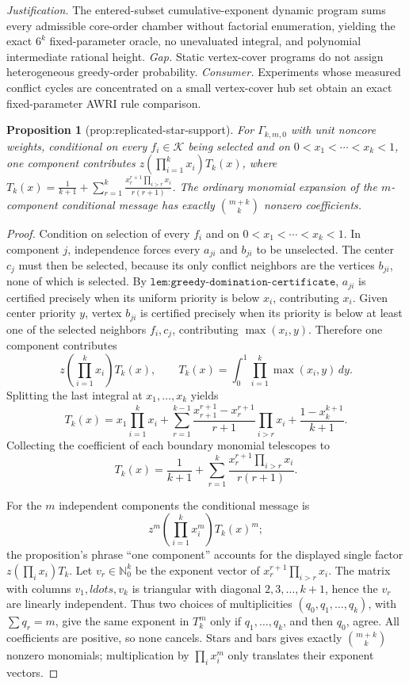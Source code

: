 \documentclass{article}
\newtheorem{proposition}{Proposition}
\begin{document}
\par\smallskip\noindent \textit{Justification.} The entered-subset cumulative-exponent dynamic program sums every admissible core-order chamber without factorial enumeration, yielding the exact \(6^k\) fixed-parameter oracle, no unevaluated integral, and polynomial intermediate rational height. \textit{Gap.} Static vertex-cover programs do not assign heterogeneous greedy-order probability. \textit{Consumer.} Experiments whose measured conflict cycles are concentrated on a small vertex-cover hub set obtain an exact fixed-parameter AWRI rule comparison.

\begin{proposition}[prop:replicated-star-support]\label{prop:replicated-star-support}
For \(\Gamma_{k,m,0}\) with unit noncore weights, conditional on every \(f_i\in\mathcal K\) being selected and on \(0<x_1<\cdots<x_k<1\), one component contributes \(z(\prod_{i=1}^kx_i)T_k(x)\), where \(T_k(x)=\frac1{k+1}+\sum_{r=1}^k\frac{x_r^{r+1}\prod_{i>r}x_i}{r(r+1)}\). The ordinary monomial expansion of the \(m\)-component conditional message has exactly \(\binom{m+k}{k}\) nonzero coefficients.
\end{proposition}
\begin{proof}
Condition on selection of every \(f_i\) and on \(0<x_1<\cdots<x_k<1\).  In component \(j\), independence forces every \(a_{ji}\) and \(b_{ji}\) to be unselected.  The center \(c_j\) must then be selected, because its only conflict neighbors are the vertices \(b_{ji}\), none of which is selected.  By \(\texttt{lem:greedy-domination-certificate}\), \(a_{ji}\) is certified precisely when its uniform priority is below \(x_i\), contributing \(x_i\).  Given center priority \(y\), vertex \(b_{ji}\) is certified precisely when its priority is below at least one of the selected neighbors \(f_i,c_j\), contributing \(\max(x_i,y)\).  Therefore one component contributes
\[
 z\left(\prod_{i=1}^kx_i\right)T_k(x),\qquad
 T_k(x)=\int_0^1\prod_{i=1}^k\max(x_i,y)\,dy.
\]
Splitting the last integral at \(x_1,\ldots,x_k\) yields
\[
 T_k(x)=x_1\prod_{i=1}^kx_i+
 \sum_{r=1}^{k-1}\frac{x_{r+1}^{r+1}-x_r^{r+1}}{r+1}
       \prod_{i>r}x_i+\frac{1-x_k^{k+1}}{k+1}.
\]
Collecting the coefficient of each boundary monomial telescopes to
\[
 T_k(x)=\frac1{k+1}+\sum_{r=1}^k
 \frac{x_r^{r+1}\prod_{i>r}x_i}{r(r+1)}.
\]

For the \(m\) independent components the conditional message is
\[
 z^m\left(\prod_{i=1}^kx_i^m\right)T_k(x)^m;
\]
the proposition's phrase ``one component'' accounts for the displayed single factor \(z(\prod_i x_i)T_k\).  Let \(v_r\in\mathbb N_0^k\) be the exponent vector of \(x_r^{r+1}\prod_{i>r}x_i\).  The matrix with columns \(v_1,ldots,v_k\) is triangular with diagonal \(2,3,\ldots,k+1\), hence the \(v_r\) are linearly independent.  Thus two choices of multiplicities \((q_0,q_1,\ldots,q_k)\), with \(\sum q_r=m\), give the same exponent in \(T_k^m\) only if \(q_1,\ldots,q_k\), and then \(q_0\), agree.  All coefficients are positive, so none cancels.  Stars and bars gives exactly \(\binom{m+k}{k}\) nonzero monomials; multiplication by \(\prod_i x_i^m\) only translates their exponent vectors.
\end{proof}
\end{document}
